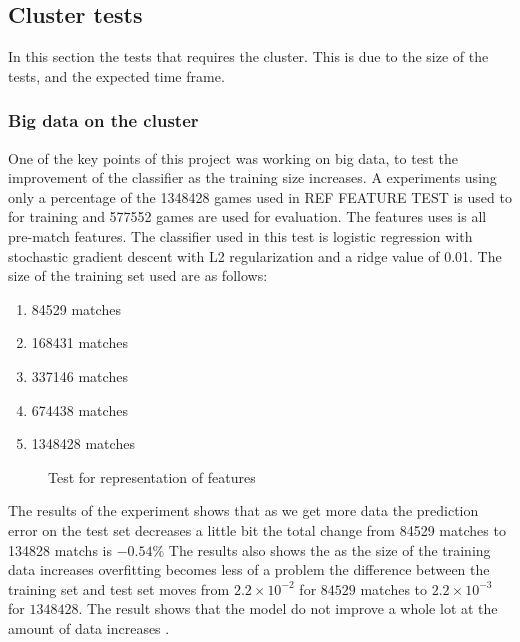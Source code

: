 \subsection{Cluster tests}\label{sec:clustertest}
In this section the tests that requires the cluster. This is due to the size of the tests, and the expected time frame.
\subsubsection{Big data on the cluster}
One of the key points of this project was working on big data, to test the improvement of the classifier as the training size increases. A experiments using only a percentage of the 1348428 games used in REF FEATURE TEST is used to for training and 577552 games are used for evaluation. The features uses is all pre-match features. The classifier used in this test is logistic regression with stochastic gradient descent with L2 regularization and a ridge value of 0.01. The size of the training set used are as follows: 
\begin{enumerate}
\item 84529 matches
\item 168431 matches 
\item 337146 matches 
\item 674438 matches
\item 1348428 matches 
\end{enumerate}
\begin{figure}[!htb]
  \centering
{}
  \caption{Test for representation of features}\label{fig:clusterbigdata}
\end{figure}
The results of the experiment shows that as we get more data the prediction error on the test set decreases a little bit the total change from 84529 matches to 134828 matchs is $-0.54\%$
The results also shows the as the size of the training data increases overfitting becomes less of a problem the difference between the training set and test set moves from $2.2\times 10^{-2}$ for $84529$ matches to $2.2\times10^{-3}$ for $1348428$. The result shows that the model do not improve a whole lot at the amount of data increases .     

